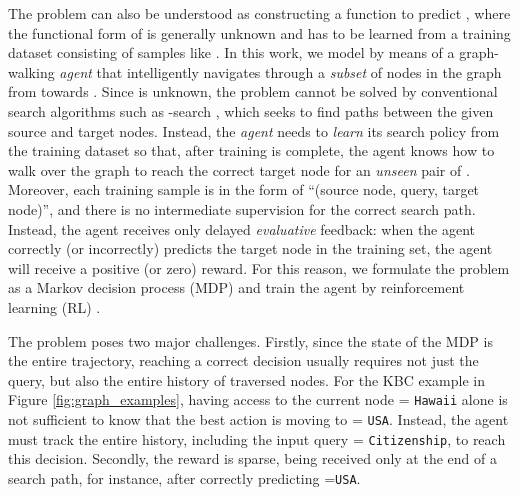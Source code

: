\documentclass{article}
\begin{document}
	
	The problem can also be understood as constructing a function  to predict , where the functional form of  is generally unknown and has to be learned from a training dataset consisting of samples like . In this work, we model  by means of a graph-walking \emph{agent} that intelligently navigates through a \emph{subset} of nodes in the graph from  towards . Since  is unknown, the problem cannot be solved by conventional search algorithms such as -search \cite{hart1968formal}, which seeks to find paths between the given source and target nodes. Instead, the \emph{agent} needs to \emph{learn} its search policy from the training dataset so that, after training is complete, the agent knows how to walk over the graph to reach the correct target node  for an \emph{unseen} pair of . Moreover, each training sample is in the form of ``(source node, query, target node)'', and there is no intermediate supervision for the correct search path. Instead, the agent receives only delayed \emph{evaluative} feedback: when the agent correctly (or incorrectly) predicts the target node in the training set, the agent will receive a positive (or zero) reward. For this reason, we formulate the problem as a Markov decision process (MDP) and train the agent by reinforcement learning (RL) \cite{sutton1998reinforcement}. 
	
	The problem poses two major challenges. Firstly, since the state of the MDP is the entire trajectory, reaching a correct decision usually requires not just the query, but also the entire history of traversed nodes. For the KBC example in Figure \ref{fig:graph_examples}, having access to the current node  = \texttt{Hawaii} alone is not sufficient to know that the best action is moving to  = \texttt{USA}. Instead, the agent must track the entire history, including the input query  = \texttt{Citizenship}, to reach this decision. Secondly, the reward is sparse, being received only at the end of a search path, for instance, after correctly predicting =\texttt{USA}. 
	
\end{document}
